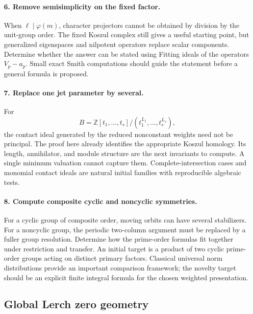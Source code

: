\documentclass[11pt,a4paper]{article}
\numberwithin{equation}{section}
\theoremstyle{definition}
\theoremstyle{remark}
\begin{document}
\paragraph{6. Remove semisimplicity on the fixed factor.}
When $\ell\mid\varphi(m)$, character projectors cannot be obtained by
division by the unit-group order. The fixed Koszul complex still gives
a useful starting point, but generalized eigenspaces and nilpotent
operators replace scalar components. Determine whether the answer can
be stated using Fitting ideals of the operators $V_p-a_p$. Small exact
Smith computations should guide the statement before a general formula
is proposed.

\paragraph{7. Replace one jet parameter by several.}
For
\[
 B=\mathbb Z[t_1,\ldots,t_s]/(t_1^{L_1},\ldots,t_s^{L_s}),
\]
the contact ideal generated by the reduced nonconstant weights need
not be principal. The proof here already identifies the appropriate
Koszul homology. Its length, annihilator, and module structure are the
next invariants to compute. A single minimum valuation cannot capture
them. Complete-intersection cases and monomial contact ideals are
natural initial families with reproducible algebraic tests.

\paragraph{8. Compute composite cyclic and noncyclic symmetries.}
For a cyclic group of composite order, moving orbits can have several
stabilizers. For a noncyclic group, the periodic two-column argument
must be replaced by a fuller group resolution. Determine how the
prime-order formulas fit together under restriction and transfer.
An initial target is a product of two cyclic prime-order groups acting
on distinct primary factors. Classical universal norm distributions
\cite{cpc:Ouyang2002} provide an important comparison framework; the
novelty target should be an explicit finite integral formula for the
chosen weighted presentation.

\subsection{Global Lerch zero geometry}
\end{document}
